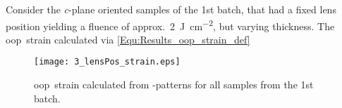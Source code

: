 Consider the \textit{c}-plane oriented samples of the 1st batch, that had a fixed lens position yielding a fluence of approx.\ \qty{2}{\joule\per\cm\squared}, but varying thickness.
The \gls{oop}\ strain calculated via \eqref{Equ:Results_oop_strain_def}
\begin{figure}
    \centering
    \texttt{[image: 3\_lensPos\_strain.eps]}
    \caption{
        \gls{oop}\ strain calculated from \thetaomega-patterns for all samples from the 1st batch.
    }
    \label{Fig:Results_3_lensStrain}
\end{figure}